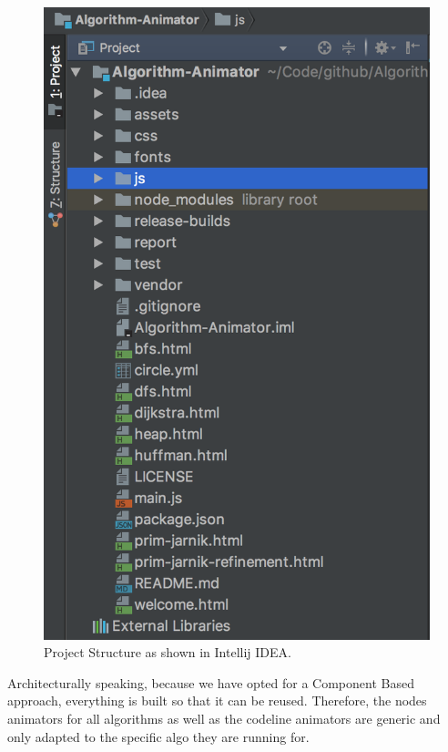 \documentclass{l4proj}
\begin{document}
\begin{itemize}
\begin{figure}[!ht]
    \centering
    \includegraphics[scale=0.5]{project-structure}
    \caption{Project Structure as shown in Intellij IDEA.}
    \label{fig:project-structure}
\end{figure}

\pagebreak

Architecturally speaking, because we have opted for a Component Based approach, everything is built so that it can be
reused. Therefore, the nodes animators for all algorithms as well as the codeline animators are generic and only
adapted to the specific algo they are running for. 


\end{itemize}
\end{document}
